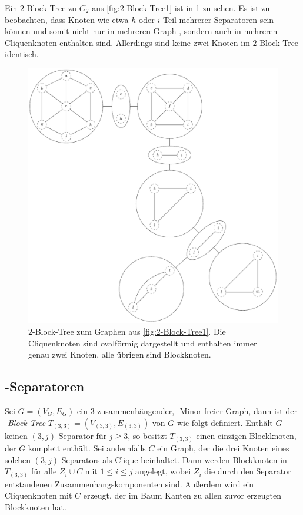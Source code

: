 Ein $2$-Block-Tree zu $G_2$ aus \Abb \ref{fig:2-Block-Tree1} ist in \Abb \ref{fig:2-Block-Tree2} zu sehen.
Es ist zu beobachten, dass Knoten wie etwa $h$ oder $i$ Teil mehrerer Separatoren sein können und somit nicht nur in mehreren Graph-, sondern auch in mehreren Cliquenknoten enthalten sind.
Allerdings sind keine zwei Knoten im $2$-Block-Tree identisch.
\begin{figure}[H]
  \centering
  \includegraphics[width=\textwidth,height=\textheight,keepaspectratio]{bilder/2-Block-Tree2.pdf}
  \caption{$2$-Block-Tree zum Graphen aus \Abb \ref{fig:2-Block-Tree1}.
           Die Cliquenknoten sind ovalförmig dargestellt und enthalten immer genau zwei Knoten, alle übrigen sind Blockknoten.}
  \label{fig:2-Block-Tree2}
\end{figure}


\subsection{\dd-Separatoren}

\begin{definition}
  Sei $G = (V_G, E_G)$ ein $3$-zusammenhängender, \kf-Minor freier Graph, dann ist der \emph{\dd-Block-Tree} $T_{(3, 3)} = (V_{(3, 3)}, E_{(3, 3)})$ von $G$ wie folgt definiert.
  Enthält $G$ keinen $(3, j)$-Separator für $j \geq 3$, so besitzt $T_{(3, 3)}$ einen einzigen Blockknoten, der $G$ komplett enthält.
  Sei andernfalls $C$ ein Graph, der die drei Knoten eines solchen $(3, j)$-Separators als Clique beinhaltet.
  Dann werden Blockknoten in $T_{(3, 3)}$ für alle $Z_i \cup C$ mit $1 \leq i \leq j$ angelegt, wobei $Z_i$ die durch den Separator entstandenen Zusammenhangskomponenten sind.
  Außerdem wird ein Cliquenknoten mit $C$ erzeugt, der im Baum Kanten zu allen zuvor erzeugten Blockknoten hat.
\end{definition}

